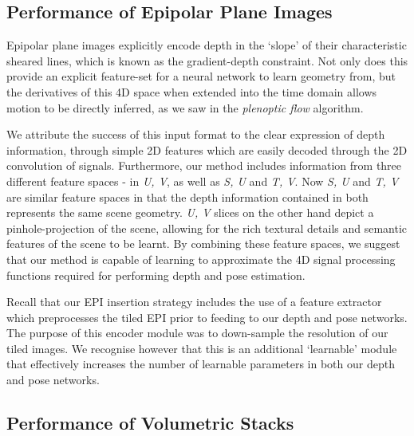 \subsection{Performance of Epipolar Plane  Images}

Epipolar plane images explicitly encode depth in the `slope' of their characteristic sheared lines, which is known as the gradient-depth constraint. Not only does this provide an explicit feature-set for a neural network to learn geometry from, but the derivatives of this 4D space when extended into the time domain allows motion to be directly inferred, as we saw in the \textit{plenoptic flow} algorithm.

We attribute the success of this input format to the clear expression of depth information, through simple 2D features which are easily decoded through the 2D convolution of signals. Furthermore, our method includes information from three different feature spaces - in \textit{U, V}, as well as \textit{S, U} and \textit{T, V}. Now \textit{S, U} and \textit{T, V} are similar feature spaces in that the depth information contained in both represents the same scene geometry. \textit{U, V} slices on the other hand depict a pinhole-projection of the scene, allowing for the rich textural details and semantic features of the scene to be learnt. By combining these feature spaces, we suggest that our method is capable of learning to approximate the 4D signal processing functions required for performing depth and pose estimation.

Recall that our EPI insertion strategy includes the use of a feature extractor which preprocesses the tiled EPI prior to feeding to our depth and pose networks. The purpose of this encoder module was to down-sample the resolution of our tiled images. We recognise however that this is an additional `learnable' module that effectively increases the number of learnable parameters in both our depth and pose networks. 


\subsection{Performance of Volumetric Stacks}

